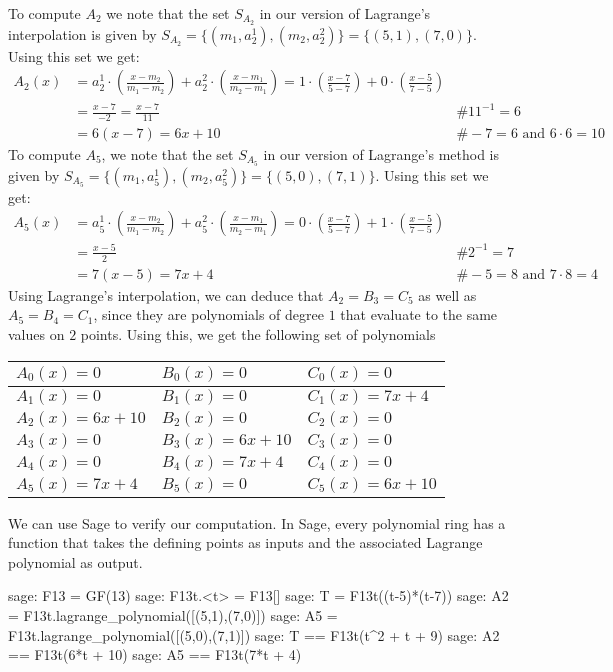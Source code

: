 \begin{example}[3-factorization]
To compute $A_2$ we note that the set $S_{A_2}$ in our version of Lagrange's interpolation  is given by $S_{A_2}=\{(m_1,a^1_2), (m_2,a_2^2)\} = \{(5,1), (7,0)\}$. Using this set we get:
\begin{align*}
A_2(x) & = a^1_2\cdot(\frac{x-m_2}{m_1-m_2}) + a^2_2\cdot(\frac{x-m_1}{m_2-m_1})
      = 1\cdot(\frac{x-7}{5-7}) + 0\cdot(\frac{x-5}{7-5}) \\
    & = \frac{x-7}{-2}
      = \frac{x-7}{11} & \text{\# } 11^{-1}=6 \\
    & = 6(x-7) 
      = 6x + 10 & \text{\# } -7 = 6 \text{ and } 6\cdot 6 = 10
\end{align*}
To compute $A_5$, we note that the set $S_{A_5}$ in our version of Lagrange's method  is given by $S_{A_5}=\{(m_1,a^1_5), (m_2,a^2_5)\} = \{(5,0), (7,1)\}$. Using this set we get:
\begin{align*}
A_5(x) & = a^1_5\cdot(\frac{x-m_2}{m_1-m_2}) + a^2_5\cdot(\frac{x-m_1}{m_2-m_1})
      = 0\cdot(\frac{x-7}{5-7}) + 1\cdot(\frac{x-5}{7-5}) \\
    & = \frac{x-5}{2} & \text{\# } 2^{-1}=7 \\
    & = 7(x-5) 
      = 7x + 4 & \text{\# } -5 = 8 \text{ and } 7\cdot 8 = 4
\end{align*}
Using Lagrange's interpolation, we can deduce that $A_2=B_3=C_5$ as well as $A_5=B_4=C_1$, since they are polynomials of degree $1$ that evaluate to the same values on $2$ points. Using this, we get the following set of polynomials
\begin{center}
\begin{tabular}{|l|l|l|}\hline 
$A_{0}(x)=0 $ &$ B_{0}(x)=0   $ & $C_{0}(x)=0$ \tabularnewline\hline 
$A_1(x)=0 $ &$ B_1(x)=0   $ & $C_1(x)=7x+4$ \tabularnewline\hline 
$A_2(x)=6x+10$ &$ B_2(x)=0$ & $C_2(x)=0$ \tabularnewline\hline 
$A_3(x)=0    $ &$ B_3(x)=6x+10$ & $C_3(x)=0$ \tabularnewline\hline 
$A_4(x)=0$ &$ B_4(x)=7x+4  $ & $C_4(x)=0$ \tabularnewline\hline 
$A_5(x)=7x+4$ &$ B_5(x)=0      $ & $C_5(x)=6x+10$ \tabularnewline\hline 
\end{tabular}
\end{center}
We can use Sage to verify our computation. In Sage, every polynomial ring has a function  that takes the defining points as inputs and the associated Lagrange polynomial as output.
\begin{sagecommandline}
sage: F13 = GF(13)
sage: F13t.<t> = F13[]
sage: T = F13t((t-5)*(t-7))
sage: A2 = F13t.lagrange_polynomial([(5,1),(7,0)])
sage: A5 = F13t.lagrange_polynomial([(5,0),(7,1)])
sage: T == F13t(t^2 + t + 9)
sage: A2 == F13t(6*t + 10)
sage: A5 == F13t(7*t + 4)
\end{sagecommandline}


\end{example}
